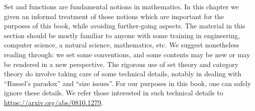 


Set and functions are fundamental notions in mathematics. In this chapter we given an informal treatment of those notions which are important for the purposes of this book, while avoiding further-going aspects. The material in this section should be mostly familiar to anyone with some training in engineering, computer science, a natural science, mathematics, etc. We suggest nonetheless reading through: we set some conventions, and some contents may be new or may be rendered in a new perspective. The rigorous use of set theory and category theory do involve taking care of some technical details, notably in dealing with ``Russel's paradox'' and ``size issues''. For our purposes in this book, one can safely ignore these details. We refer those interested in such technical details to \url{https://arxiv.org/abs/0810.1279}.  


\label{ch:sets}







